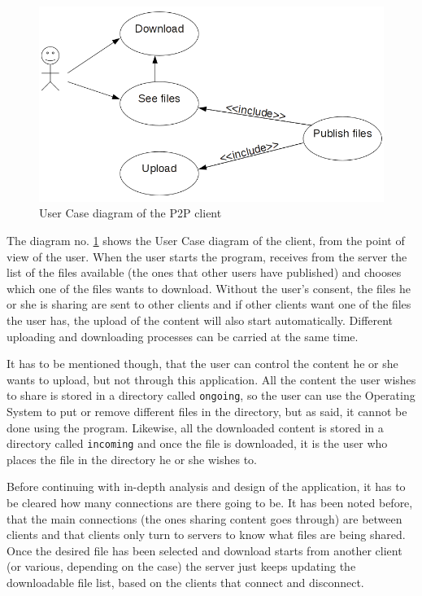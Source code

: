 \begin{figure}
   \centering
   \includegraphics[scale=0.5]{irudiak/usercase.png}
   \caption{User Case diagram of the P2P client}
   \label{fig:usercase}
\end{figure}

The diagram no. \ref{fig:usercase} shows the User Case diagram of the client, from the point of view of the user. When the user starts the program, receives from the server the list of the files available (the ones that other users have published) and chooses which one of the files wants to download. Without the user's consent, the files he or she is sharing are sent to other clients and if other clients want one of the files the user has, the upload of the content will also start automatically. Different uploading and downloading processes can be carried at the same time. 

It has to be mentioned though, that the user can control the content he or she wants to upload, but not through this application. All the content the user wishes to share is stored in a directory called \texttt{ongoing}, so the user can use the Operating System to put or remove different files in the directory, but as said, it cannot be done using the program. Likewise, all the downloaded content is stored in a directory called \texttt{incoming} and once the file is downloaded, it is the user who places the file in the directory he or she wishes to.

Before continuing with in-depth analysis and design of the application, it has to be cleared how many connections are there going to be. It has been noted before, that the main connections (the ones sharing content goes through) are between clients and that clients only turn to servers to know what files are being shared. Once the desired file has been selected and download starts from another client (or various, depending on the case) the server just keeps updating the downloadable file list, based on the clients that connect and disconnect. 

